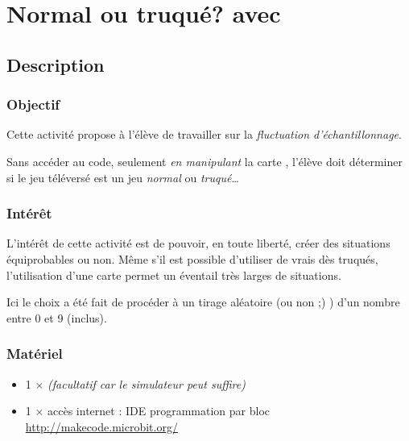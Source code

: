 \section{Normal ou truqué? avec \mb}

%
\pagestyle{mb} %

\subsection{Description}

\subsubsection{Objectif}


\begin{formule}
Cette activité propose à l'élève de travailler sur la \emph{fluctuation d'échantillonnage}.

Sans accéder au code, seulement \emph{en manipulant} la carte \mb, l'élève doit déterminer si le jeu téléversé est un jeu \emph{normal} ou \emph{truqué}\ldots
\end{formule}


\subsubsection{Intérêt}

L'intérêt de cette activité est de pouvoir, en toute liberté, créer des situations équiprobables ou non. Même s'il est possible d'utiliser de vrais dès truqués, l'utilisation d'une carte \mb permet un éventail très larges de situations.

Ici le choix a été fait de procéder à un tirage aléatoire (ou non ;) ) d'un nombre entre 0 et 9 (inclus).


\subsubsection{Matériel}
\begin{itemize}
    \item 1 $\times$ \matosMb \emph{(facultatif car le simulateur peut suffire)}
    \item 1 $\times$ accès internet : IDE programmation par bloc \url{http://makecode.microbit.org/}
\end{itemize}




